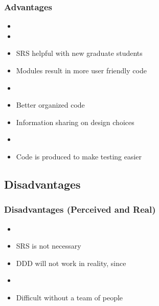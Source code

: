 \documentclass{beamer}
\begin{document}

\begin{frame}

\frametitle{Advantages}

\begin{itemize}
\item {}
\item {}
\item SRS helpful with new graduate students
\item Modules result in more user friendly code
\item {}
\item Better organized code
\item Information sharing on design choices
\item {}
\item Code is produced to make testing easier
\end{itemize}

\end{frame}


\subsection[Disadvantages]{Disadvantages}


\begin{frame}

\frametitle{Disadvantages (Perceived and Real)}

\begin{itemize}
\item {}
\item SRS is not necessary
\item DDD will not work in reality, since 
\item {}
\item Difficult without a team of people
\end{itemize}

\end{frame}
\end{document}
